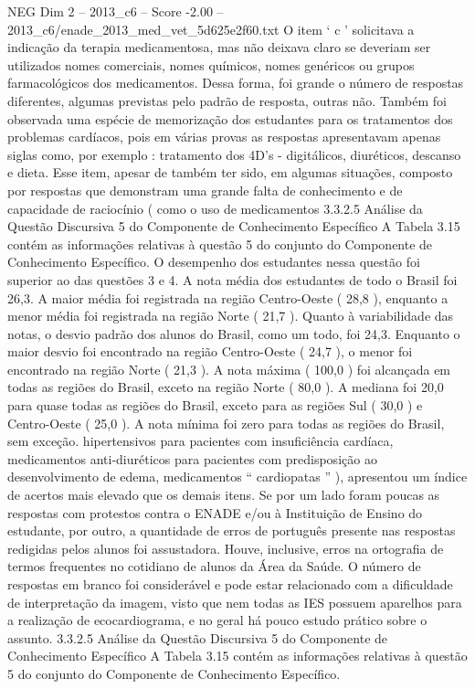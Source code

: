 \begin{textsample}{NEG Dim 2 – 2013\_c6 – Score -2.00 – 2013\_c6/enade\_2013\_med\_vet\_5d625e2f60.txt}
O item ‘ c ’ solicitava a indicação da terapia medicamentosa, mas não deixava claro se deveriam ser utilizados nomes comerciais, nomes químicos, nomes genéricos ou grupos farmacológicos dos medicamentos.
Dessa forma, foi grande o número de respostas diferentes, algumas previstas pelo padrão de resposta, outras não.
Também foi observada uma espécie de memorização dos estudantes para os tratamentos dos problemas cardíacos, pois em várias provas as respostas apresentavam apenas siglas como, por exemplo : tratamento dos 4D’s - digitálicos, diuréticos, descanso e dieta.
Esse item, apesar de também ter sido, em algumas situações, composto por respostas que demonstram uma grande falta de conhecimento e de capacidade de raciocínio ( como o uso de medicamentos 3.3.2.5 Análise da Questão Discursiva 5 do Componente de Conhecimento Específico A Tabela 3.15 contém as informações relativas à questão 5 do conjunto do Componente de Conhecimento Específico.
O desempenho dos estudantes nessa questão foi superior ao das questões 3 e 4.
A nota média dos estudantes de todo o Brasil foi 26,3.
A maior média foi registrada na região Centro-Oeste ( 28,8 ), enquanto a menor média foi registrada na região Norte ( 21,7 ).
Quanto à variabilidade das notas, o desvio padrão dos alunos do Brasil, como um todo, foi 24,3.
Enquanto o maior desvio foi encontrado na região Centro-Oeste ( 24,7 ), o menor foi encontrado na região Norte ( 21,3 ).
A nota máxima ( 100,0 ) foi alcançada em todas as regiões do Brasil, exceto na região Norte ( 80,0 ).
A mediana foi 20,0 para quase todas as regiões do Brasil, exceto para as regiões Sul ( 30,0 ) e Centro-Oeste ( 25,0 ).
A nota mínima foi zero para todas as regiões do Brasil, sem exceção. hipertensivos para pacientes com insuficiência cardíaca, medicamentos anti-diuréticos para pacientes com predisposição ao desenvolvimento de edema, medicamentos “ cardiopatas ” ), apresentou um índice de acertos mais elevado que os demais itens.
Se por um lado foram poucas as respostas com protestos contra o ENADE e/ou à Instituição de Ensino do estudante, por outro, a quantidade de erros de português presente nas respostas redigidas pelos alunos foi assustadora.
Houve, inclusive, erros na ortografia de termos frequentes no cotidiano de alunos da Área da Saúde.
O número de respostas em branco foi considerável e pode estar relacionado com a dificuldade de interpretação da imagem, visto que nem todas as IES possuem aparelhos para a realização de ecocardiograma, e no geral há pouco estudo prático sobre o assunto. 3.3.2.5 Análise da Questão Discursiva 5 do Componente de Conhecimento Específico A Tabela 3.15 contém as informações relativas à questão 5 do conjunto do Componente de Conhecimento Específico.

\end{textsample}
